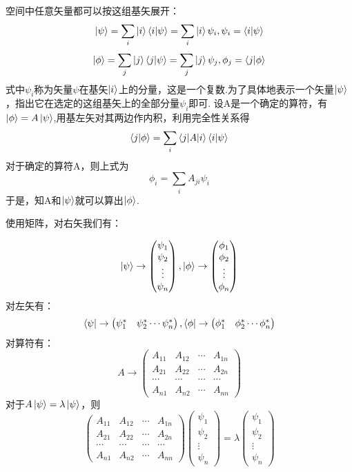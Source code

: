 \documentclass[13pt,a4paper]{article}
\begin{document}
\begin{CJK}{UTF8}{song}
空间中任意矢量都可以按这组基矢展开：
$$\ket{\psi}=\sum_i \ket{i}\braket{i|\psi}=\sum_i\ket{i}\psi_i,\psi_i=\braket{i|\psi}$$
$$\ket{\phi}=\sum_j \ket{j}\braket{j|\psi}=\sum_j\ket{j}\psi_j,\phi_j=\braket{j|\phi}$$
式中$\psi_i$称为矢量$\psi$在基矢$\ket{i}$上的分量，这是一个复数.为了具体地表示一个矢量$\ket{\psi}$，指出它在选定的这组基矢上的全部分量${\psi_i}$即可.
设A是一个确定的算符，有$\ket{\phi}=A\ket{\psi}$,用基左矢对其两边作内积，利用完全性关系得
$$\braket{j|\phi}=\sum_i\braket{j|A|i}\braket{i|\psi}$$
对于确定的算符A，则上式为$$\phi_i=\sum_i A_{ji}\psi_i$$
于是，知A和$\ket{\psi}$就可以算出$\ket{\phi}$.

使用矩阵，对右矢我们有：

$$\ket{\psi}\rightarrow\begin{pmatrix}\psi_1\\\psi_2\\ \vdots \\\psi_n\end{pmatrix}
,\ket{\phi}\rightarrow\begin{pmatrix}\phi_1\\\phi_2 \\ \vdots \\\phi_n\end{pmatrix}$$
对左矢有：$$\bra{\psi}\rightarrow\begin{pmatrix}\psi_1^*&\psi_2^*\cdots \psi_n^*\end{pmatrix},\bra{\phi}\rightarrow\begin{pmatrix}\phi_1^*&\phi_2^*\cdots \phi_n^*\end{pmatrix}$$
对算符有：$$A\rightarrow\begin{pmatrix}A_{11}&A_{12}&\cdots &A_{1n}\\A_{21}&A_{22}&\cdots &A_{2n}\\\cdots&\cdots&\cdots &\cdots\\A_{n1}&A_{n2}&\cdots &A_{nn}\end{pmatrix}$$
对于$A\ket{\psi}=\lambda\ket{\psi}$，则
$$\begin{pmatrix}A_{11}&A_{12}&\cdots &A_{1n}\\A_{21}&A_{22}&\cdots &A_{2n}\\\cdots&\cdots&\cdots &\cdots\\A_{n1}&A_{n2}&\cdots &A_{nn}\end{pmatrix}\begin{pmatrix}\psi_1\\\psi_2\\ \vdots \\\psi_n\end{pmatrix}=\lambda\begin{pmatrix}\psi_1\\\psi_2\\ \vdots \\\psi_n\end{pmatrix}$$

\end{CJK}
\end{document}
